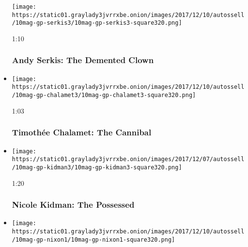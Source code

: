 \begin{itemize}
  \texttt{[image: https://static01.graylady3jvrrxbe.onion/images/2017/12/10/autossell/10mag-gp-serkis3/10mag-gp-serkis3-square320.png]}

  1:10

  \hypertarget{andy-serkis-the-demented-clown}{%
  \subsubsection{Andy Serkis: The Demented
  Clown}\label{andy-serkis-the-demented-clown}}
\item
  \href{https://www.nytimes3xbfgragh.onion/video/magazine/100000005588864/timothee-chalamet-the-cannibal.html?action=click\&module=video-series-bar\&region=header\&pgtype=Article\&playlistId=video/magazine}{}

  \texttt{[image: https://static01.graylady3jvrrxbe.onion/images/2017/12/10/autossell/10mag-gp-chalamet3/10mag-gp-chalamet3-square320.png]}

  1:03

  \hypertarget{timotheux301e-chalamet-the-cannibal}{%
  \subsubsection{Timothée Chalamet: The
  Cannibal}\label{timotheux301e-chalamet-the-cannibal}}
\item
  \href{https://www.nytimes3xbfgragh.onion/video/magazine/100000005588835/nicole-kidman-the-possessed.html?action=click\&module=video-series-bar\&region=header\&pgtype=Article\&playlistId=video/magazine}{}

  \texttt{[image: https://static01.graylady3jvrrxbe.onion/images/2017/12/07/autossell/10mag-gp-kidman3/10mag-gp-kidman3-square320.png]}

  1:20

  \hypertarget{nicole-kidman-the-possessed}{%
  \subsubsection{Nicole Kidman: The
  Possessed}\label{nicole-kidman-the-possessed}}
\item
  \href{https://www.nytimes3xbfgragh.onion/video/magazine/100000005588895/cynthia-nixon-the-ghost-bride.html?action=click\&module=video-series-bar\&region=header\&pgtype=Article\&playlistId=video/magazine}{}

  \texttt{[image: https://static01.graylady3jvrrxbe.onion/images/2017/12/10/autossell/10mag-gp-nixon1/10mag-gp-nixon1-square320.png]}


\end{itemize}
